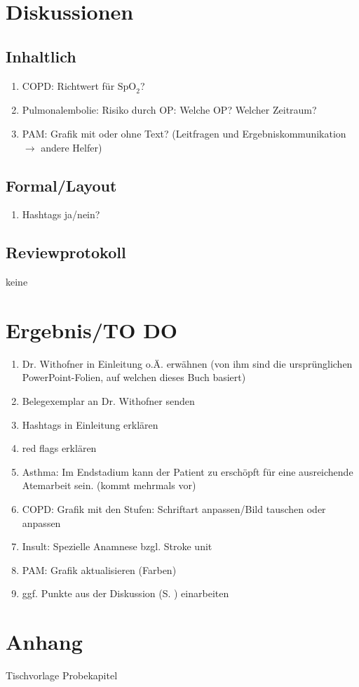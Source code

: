 \documentclass[
ngerman,
paper=a4,
asymmetric,
fontsize=10pt,
draft=false,
numbers=noenddot,
bibtotocnumbered,
footnotes=multiple,
]{scrreprt}
\begin{document}
\chapter{Diskussionen}
\label{chp:review-diskussion}
\section{Inhaltlich}
\begin{enumerate}
  \item COPD: Richtwert für $\text{SpO}_2$?
  \item Pulmonalembolie: Risiko durch OP: Welche OP? Welcher Zeitraum?
  \item PAM: Grafik mit oder ohne Text? (\glqq{}Leitfragen\grqq{} und
  \glqq{}Ergebniskommunikation $\to$ andere Helfer\grqq{})
\end{enumerate}

\section{Formal/Layout}
\begin{enumerate}
  \item Hashtags ja/nein?
\end{enumerate}

\section{Reviewprotokoll}
keine

\chapter{Ergebnis/TO DO}
\begin{enumerate}
  \item Dr. Withofner in Einleitung o.Ä. erwähnen (von ihm sind die
  ursprünglichen PowerPoint-Folien, auf welchen dieses Buch basiert)
  \item Belegexemplar an Dr. Withofner senden
  \item Hashtags in Einleitung erklären
  \item \glqq{}red flags\grqq{} erklären
  \item Asthma: \glqq{}Im Endstadium kann der Patient zu erschöpft für eine
  ausreichende Atemarbeit sein.\grqq{} (kommt mehrmals vor)
  \item COPD: Grafik mit den Stufen: Schriftart anpassen/Bild tauschen oder
  anpassen
  \item Insult: Spezielle Anamnese bzgl. Stroke unit
  \item PAM: Grafik aktualisieren (Farben)
  \item ggf. Punkte aus der Diskussion (S. \pageref{chp:review-diskussion})
  einarbeiten
\end{enumerate}

\appendix
\chapter{Anhang}
Tischvorlage Probekapitel \CC{[PAM]}


\printbibliography
{}
\end{document}
